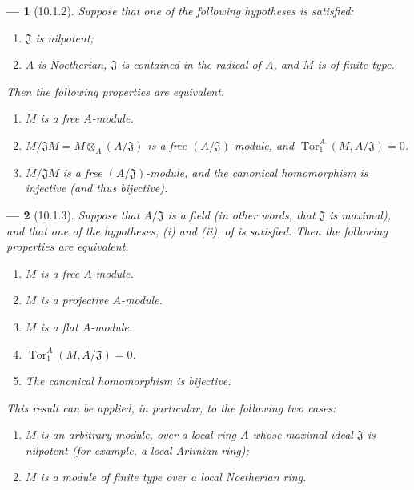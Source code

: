 \documentclass[oneside]{amsart}
\theoremstyle{ega-env-style}
\newtheorem*{env}{---}
\theoremstyle{ega-thm-env-style}
\theoremstyle{ega-defn-env-style}
\def\Tor{\operatorname{Tor}}
\newcommand{\oldpage}[2][]{{\marginnote{\normalfont{\textbf{#1}~|~#2}}}\ignorespaces}
\let\EGAOriginalLabel\label
\renewcommand{\label}[1]{\phantomsection\EGAOriginalLabel{#1}}
\begin{document}
\oldpage[0\textsubscript{III-1}]{18}
\begin{env}[10.1.2]
\label{0.10.1.2}
Suppose that \emph{one} of the following hypotheses is satisfied:
\begin{enumerate}
  \item[(i)] $\mathfrak{J}$ is nilpotent;
  \item[(ii)] $A$ is Noetherian, $\mathfrak{J}$ is contained in the radical of $A$, and $M$ is of finite type.
\end{enumerate}
Then the following properties are equivalent.
\begin{enumerate}
  \item[(a)] $M$ is a free $A$-module.
  \item[(b)] $M/\mathfrak{J}M=M\otimes_A(A/\mathfrak{J})$ is a free $(A/\mathfrak{J})$-module, and $\Tor_1^A(M,A/\mathfrak{J})=0$.
  \item[(c)] $M/\mathfrak{J}M$ is a free $(A/\mathfrak{J})$-module, and the canonical homomorphism  is injective (and thus bijective).
\end{enumerate}
\end{env}

\begin{env}[10.1.3]
\label{0.10.1.3}
Suppose that $A/\mathfrak{J}$ is a \emph{field} (in other words, that $\mathfrak{J}$ is maximal), and that one of the hypotheses, (i) and (ii), of  is satisfied.
Then the following properties are equivalent.
\begin{enumerate}
  \item[(a)] $M$ is a free $A$-module.
  \item[(b)] $M$ is a projective $A$-module.
  \item[(c)] $M$ is a flat $A$-module.
  \item[(d)] $\Tor_1^A(M,A/\mathfrak{J})=0$.
  \item[(e)] The canonical homomorphism  is bijective.
\end{enumerate}

This result can be applied, in particular, to the following two cases:
\begin{enumerate}
  \item[(i)] $M$ is an \emph{arbitrary} module, over a local ring $A$ whose maximal ideal $\mathfrak{J}$ is \emph{nilpotent} (for example, a local Artinian ring);
  \item[(ii)] $M$ is a module \emph{of finite type} over a \emph{local Noetherian} ring.
\end{enumerate}
\end{env}
\end{document}
